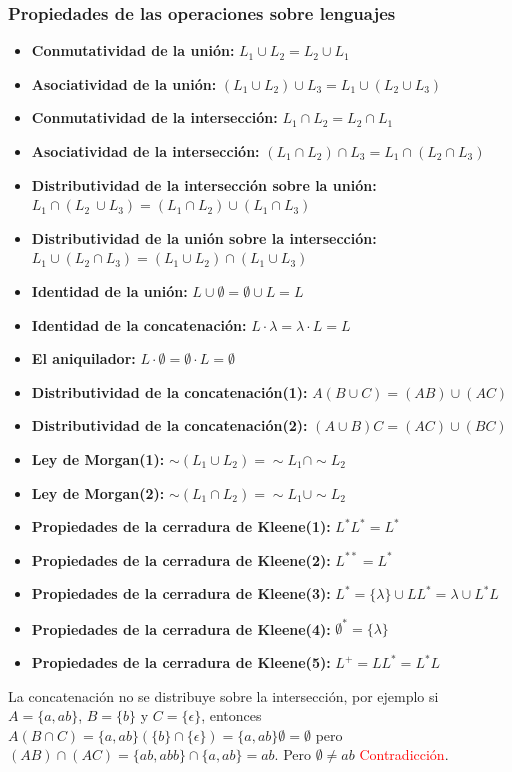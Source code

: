 \subsubsection{Propiedades de las operaciones sobre lenguajes}
\begin{itemize}
    \item \textbf{Conmutatividad de la unión:} $L_1 \cup L_2 = L_2 \cup L_1$
    \item \textbf{Asociatividad de la unión:} $(L_1 \cup L_2) \cup L_3 = L_1 \cup (L_2 \cup L_3)$
    \item \textbf{Conmutatividad de la intersección:} $L_1 \cap L_2 = L_2 \cap L_1$
    \item \textbf{Asociatividad de la intersección:} $(L_1 \cap L_2) \cap L_3 = L_1 \cap (L_2 \cap L_3)$
    \item \textbf{Distributividad de la intersección sobre la unión:} $L_1 \cap (L_2\ \cup L_3) = (L_1 \cap L_2) \cup (L_1 \cap L_3)$
    \item \textbf{Distributividad de la unión sobre la intersección:} $L_1 \cup (L_2 \cap L_3) = (L_1 \cup L_2) \cap (L_1 \cup L_3)$
    \item \textbf{Identidad de la unión:} $L \cup \emptyset = \emptyset \cup L = L$
    \item \textbf{Identidad de la concatenación:} $L \cdot \lambda = \lambda \cdot L = L$
    \item \textbf{El aniquilador:} $L \cdot \emptyset = \emptyset \cdot L = \emptyset$
    \item \textbf{Distributividad de la concatenación(1):} $A(B \cup C) = (AB) \cup (AC)$
    \item \textbf{Distributividad de la concatenación(2):} $(A \cup B)C = (AC) \cup (BC)$
    \item \textbf{Ley de Morgan(1):} $\sim (L_1 \cup L_2) = \sim L_1 \cap \sim L_2$
    \item \textbf{Ley de Morgan(2):} $\sim (L_1 \cap L_2) = \sim L_1 \cup \sim L_2$
    \item \textbf{Propiedades de la cerradura de Kleene(1):} $L^*L^* = L^*$
    \item \textbf{Propiedades de la cerradura de Kleene(2):} $L^{**} = L^*$
    \item \textbf{Propiedades de la cerradura de Kleene(3):} $L^* = \{\lambda\} \cup LL^* = \lambda \cup L^*L$
    \item \textbf{Propiedades de la cerradura de Kleene(4):} $\emptyset^* = \{\lambda\}$
    \item \textbf{Propiedades de la cerradura de Kleene(5):} $L^+ = LL^* = L^*L$
\end{itemize}

    La concatenación no se distribuye sobre la intersección, por ejemplo si $A = \{a,ab\}$, $B = \{b\}$ y $C = \{\epsilon\}$, 
    entonces $A(B \cap C) = \{a,ab\}(\{b\} \cap \{\epsilon\}) = \{a,ab\}{\emptyset} = \emptyset$  pero $(AB) \cap (AC) = \{ab, abb\} \cap \{a, ab\} = ab$. Pero $\emptyset \neq ab$ \textcolor{red}{Contradicción}.